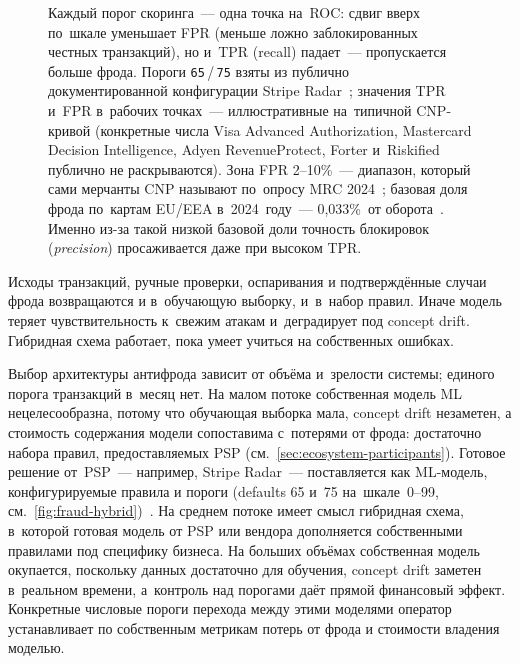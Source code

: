 \begin{figure}[tbp]
  \centering
  \caption{Каждый порог скоринга~--- одна точка на~ROC: сдвиг вверх
  по~шкале уменьшает FPR (меньше ложно заблокированных честных
  транзакций), но и~TPR (recall) падает~--- пропускается больше
  фрода. Пороги \texttt{65}\,/\,\texttt{75} взяты из публично
  документированной конфигурации Stripe Radar~\cite{stripe-radar-risk-settings};
  значения TPR и~FPR в~рабочих точках~--- иллюстративные на~типичной CNP-кривой
  (конкретные числа Visa Advanced Authorization, Mastercard Decision
  Intelligence, Adyen RevenueProtect, Forter и~Riskified публично не
  раскрываются). Зона FPR 2--10\%~--- диапазон, который сами мерчанты
  CNP называют по~опросу MRC 2024~\cite{mrc-fraud-report-2024}; базовая
  доля фрода по~картам EU/EEA в~2024~году~--- 0,033\%~от оборота~\cite{ecb-eba-payment-fraud-2025}.
  Именно из-за такой низкой базовой доли точность блокировок
  (\textit{precision}) просаживается даже при высоком TPR.}\label{fig:fraud-hybrid}
\end{figure}

Исходы транзакций, ручные проверки, оспаривания и подтверждённые
случаи фрода возвращаются и в~обучающую выборку, и~в~набор правил.
Иначе модель теряет чувствительность к~свежим атакам и~деградирует
под concept drift. Гибридная схема работает, пока умеет учиться
на собственных ошибках.

Выбор архитектуры антифрода зависит от объёма и~зрелости системы;
единого порога транзакций в~месяц нет. На малом потоке собственная
модель ML нецелесообразна, потому что обучающая выборка мала, concept
drift незаметен, а стоимость содержания модели сопоставима с~потерями
от фрода: достаточно набора правил, предоставляемых PSP
(см.~\autoref{sec:ecosystem-participants}). Готовое решение от~PSP~---
например, Stripe Radar~--- поставляется как ML-модель,
конфигурируемые правила и пороги (defaults 65 и~75 на~шкале~0--99,
см.~\autoref{fig:fraud-hybrid})~\cite{stripe-radar-risk-settings}. На среднем
потоке имеет смысл гибридная схема, в~которой готовая модель от PSP
или вендора дополняется собственными правилами под специфику бизнеса.
На больших объёмах собственная модель окупается, поскольку данных
достаточно для обучения, concept drift заметен в~реальном времени,
а~контроль над порогами даёт прямой финансовый эффект. Конкретные
числовые пороги перехода между этими моделями оператор устанавливает
по собственным метрикам потерь от фрода и стоимости владения моделью.

